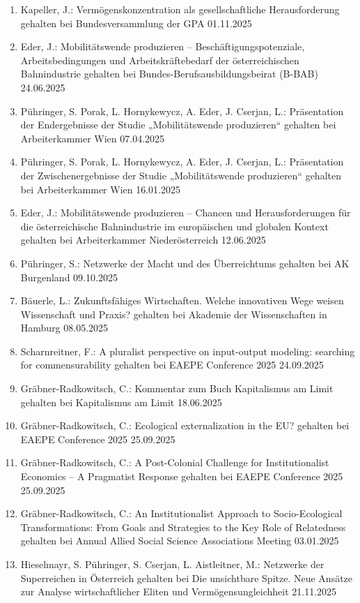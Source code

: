 \begin{enumerate}
	\item Kapeller, J.: Vermögenskonzentration als gesellschaftliche Herausforderung gehalten bei Bundesversammlung der GPA 01.11.2025
	\item Eder, J.: Mobilitätswende produzieren -- Beschäftigungspotenziale, Arbeitsbedingungen und Arbeitskräftebedarf der österreichischen Bahnindustrie gehalten bei Bundes-Berufsausbildungsbeirat (B-BAB) 24.06.2025
	\item Pühringer, S. Porak, L. Hornykewycz, A. Eder, J. Cserjan, L.: Präsentation der Endergebnisse der Studie „Mobilitätswende produzieren“ gehalten bei Arbeiterkammer Wien 07.04.2025
	\item Pühringer, S. Porak, L. Hornykewycz, A. Eder, J. Cserjan, L.: Präsentation der Zwischenergebnisse der Studie „Mobilitätswende produzieren“ gehalten bei Arbeiterkammer Wien 16.01.2025
	\item Eder, J.: Mobilitätswende produzieren -- Chancen und Herausforderungen für die österreichische Bahnindustrie im europäischen und globalen Kontext gehalten bei Arbeiterkammer Niederösterreich 12.06.2025
	\item Pühringer, S.: Netzwerke der Macht und des Überreichtums gehalten bei AK Burgenland 09.10.2025
	\item Bäuerle, L.: Zukunftsfähiges Wirtschaften. Welche innovativen Wege weisen Wissenschaft und Praxis? gehalten bei Akademie der Wissenschaften in Hamburg 08.05.2025
	\item Scharnreitner, F.: A pluralist perspective on input-output modeling: searching for commensurability gehalten bei EAEPE Conference 2025 24.09.2025
	\item Gräbner-Radkowitsch, C.: Kommentar zum Buch \glqq Kapitalismus am Limit\grqq{} gehalten bei Kapitalismus am Limit 18.06.2025
	\item Gräbner-Radkowitsch, C.: Ecological externalization in the EU? gehalten bei EAEPE Conference 2025 25.09.2025
	\item Gräbner-Radkowitsch, C.: A Post-Colonial Challenge for Institutionalist Economics -- A Pragmatist Response gehalten bei EAEPE Conference 2025 25.09.2025
	\item Gräbner-Radkowitsch, C.: An Institutionalist Approach to Socio-Ecological Transformations: From Goals and Strategies to the Key Role of Relatedness gehalten bei Annual Allied Social Science Associations Meeting 03.01.2025
	\item Hieselmayr, S. Pühringer, S. Cserjan, L. Aistleitner, M.: Netzwerke der Superreichen in Österreich gehalten bei Die unsichtbare Spitze. Neue Ansätze zur Analyse wirtschaftlicher Eliten und Vermögensungleichheit 21.11.2025

\end{enumerate}
